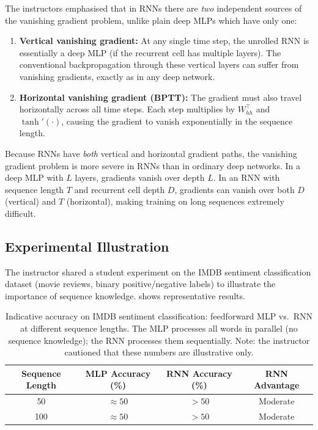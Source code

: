 \documentclass[12pt,a4paper]{article}
\newcommand{\Whh}{W_{hh}}
\begin{document}
The instructors emphasised that in RNNs there are \emph{two} independent sources
of the vanishing gradient problem, unlike plain deep MLPs which have only one:

\begin{enumerate}[label=\arabic*.]
  \item \textbf{Vertical vanishing gradient:} At any single time step, the
        unrolled RNN is essentially a deep MLP (if the recurrent cell has
        multiple layers).  The conventional backpropagation through these
        vertical layers can suffer from vanishing gradients, exactly as in any
        deep network.
  \item \textbf{Horizontal vanishing gradient (BPTT):} The gradient must also
        travel horizontally across all time steps.  Each step multiplies by
        $\Whh^{\top}$ and $\tanh'(\cdot)$, causing the gradient to vanish
        exponentially in the sequence length.
\end{enumerate}

\begin{warningbox}[title=Compounded Vanishing Gradient in RNNs]
Because RNNs have \emph{both} vertical and horizontal gradient paths, the
vanishing gradient problem is more severe in RNNs than in ordinary deep
networks.  In a deep MLP with $L$ layers, gradients vanish over depth $L$.  In
an RNN with sequence length $T$ and recurrent cell depth $D$, gradients can
vanish over both $D$ (vertical) and $T$ (horizontal), making training on long
sequences extremely difficult.
\end{warningbox}

\subsection{Experimental Illustration}
\label{subsec:experiment}

The instructor shared a student experiment on the IMDB sentiment classification
dataset (movie reviews, binary positive/negative labels) to illustrate the
importance of sequence knowledge.   shows representative results.

\begin{table}[ht]
\centering
\caption{Indicative accuracy on IMDB sentiment classification: feedforward MLP
vs.\ RNN at different sequence lengths.  The MLP processes all words in
parallel (no sequence knowledge); the RNN processes them sequentially.
Note: the instructor cautioned that these numbers are illustrative only.}
\label{tab:imdb}
\renewcommand{\arraystretch}{1.3}
\begin{tabular}{@{}cccc@{}}
\toprule
\textbf{Sequence Length} &
\textbf{MLP Accuracy (\%)} &
\textbf{RNN Accuracy (\%)} &
\textbf{RNN Advantage} \\
\midrule
50  & $\approx 50$ & $> 50$ & Moderate \\
100 & $\approx 50$ & $> 50$ & Moderate \\
\bottomrule
\end{tabular}
\end{table}
\end{document}
